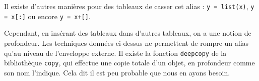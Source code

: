 Il existe d'autres manières pour des tableaux de casser cet alias : \texttt{y = list(x)}, \texttt{y = 
x[:]} ou encore \texttt{y = x+[]}.

Cependant, en insérant des tableaux dans d'autres tableaux, on a une notion de \og profondeur\fg. Les 
techniques données ci-dessus ne permettent de rompre un alias qu'au niveau de l'enveloppe externe. 
Il existe la fonction \texttt{deepcopy} de la bibliothèque \texttt{copy}, qui effectue une copie totale 
d'un objet, en profondeur comme son nom l'indique. Cela dit il est peu probable que nous en ayons 
besoin.

%
%
%
%    
%
%
%
%
%
%
%
